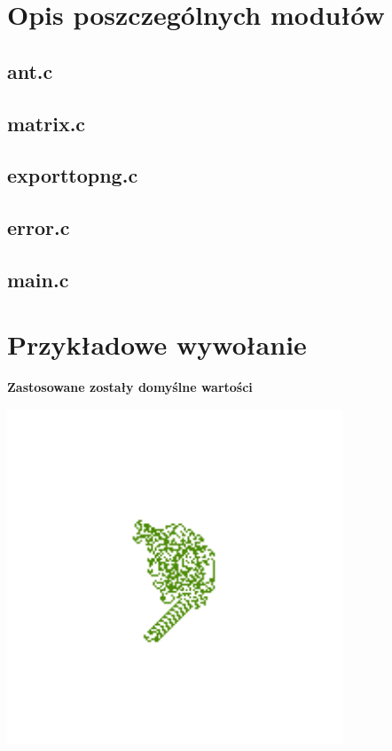 \documentclass[a4paper,12pt]{article}
\begin{document}
\section{Opis poszczególnych modułów}
\subsection{ant.c}
\subsection{matrix.c}
\subsection{exporttopng.c}
\subsection{error.c}
\subsection{main.c}
\newpage
\section{Przykładowe wywołanie}
\textbf{Zastosowane zostały domyślne wartości}
\begin{center}
\includegraphics[height=10cm]{out}
\end{center}
\end{document}
